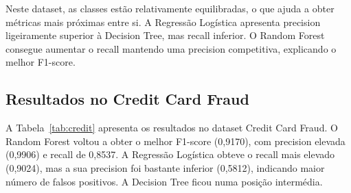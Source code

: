 \documentclass[10pt,twocolumn]{article}
\begin{document}
\begin{table}[H]
\centering
\caption{Métricas de desempenho no Bank Marketing.}
\label{tab:bank}
\end{table}

Neste dataset, as classes estão relativamente equilibradas, o que ajuda a obter métricas mais próximas entre si. A Regressão Logística apresenta precision ligeiramente superior à Decision Tree, mas recall inferior. O Random Forest consegue aumentar o recall mantendo uma precision competitiva, explicando o melhor F1-score.

\subsection{Resultados no Credit Card Fraud}
A Tabela~\ref{tab:credit} apresenta os resultados no dataset Credit Card Fraud. O Random Forest voltou a obter o melhor F1-score (0,9170), com precision elevada (0,9906) e recall de 0,8537. A Regressão Logística obteve o recall mais elevado (0,9024), mas a sua precision foi bastante inferior (0,5812), indicando maior número de falsos positivos. A Decision Tree ficou numa posição intermédia.

\begin{table}[H]
\centering
\caption{Métricas de desempenho no Credit Card Fraud.}
\label{tab:credit}
\end{table}
\end{document}
